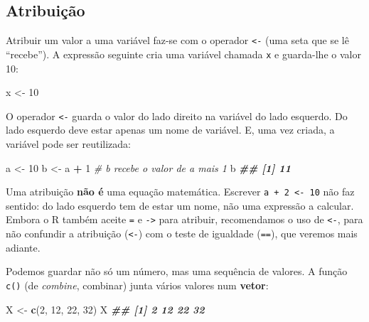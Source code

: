 \documentclass[
  portuguese,
  11pt,
  openany]{book}
\newenvironment{Shaded}{\begin{snugshade}}{\end{snugshade}}
\newcommand{\CommentTok}[1]{\textcolor[rgb]{0.56,0.35,0.01}{\textit{#1}}}
\newcommand{\DecValTok}[1]{\textcolor[rgb]{0.00,0.00,0.81}{#1}}
\newcommand{\DocumentationTok}[1]{\textcolor[rgb]{0.56,0.35,0.01}{\textbf{\textit{#1}}}}
\newcommand{\FunctionTok}[1]{\textcolor[rgb]{0.13,0.29,0.53}{\textbf{#1}}}
\newcommand{\NormalTok}[1]{#1}
\newcommand{\OtherTok}[1]{\textcolor[rgb]{0.56,0.35,0.01}{#1}}
\newcommand{\SpecialCharTok}[1]{\textcolor[rgb]{0.81,0.36,0.00}{\textbf{#1}}}
\begin{document}
\subsection{Atribuição}\label{atribuiuxe7uxe3o}

Atribuir um valor a uma variável faz-se com o operador \texttt{\textless{}-} (uma seta que se lê ``recebe''). A expressão seguinte cria uma variável chamada \texttt{x} e guarda-lhe o valor 10:

\begin{Shaded}
\begin{Highlighting}[]
\NormalTok{x }\OtherTok{\textless{}{-}} \DecValTok{10}
\end{Highlighting}
\end{Shaded}

O operador \texttt{\textless{}-} guarda o valor do lado direito na variável do lado esquerdo. Do lado esquerdo deve estar apenas um nome de variável. E, uma vez criada, a
variável pode ser reutilizada:

\begin{Shaded}
\begin{Highlighting}[]
\NormalTok{a }\OtherTok{\textless{}{-}} \DecValTok{10}
\NormalTok{b }\OtherTok{\textless{}{-}}\NormalTok{ a }\SpecialCharTok{+} \DecValTok{1}   \CommentTok{\# b recebe o valor de a mais 1}
\NormalTok{b}
\DocumentationTok{\#\# [1] 11}
\end{Highlighting}
\end{Shaded}

Uma atribuição \textbf{não é} uma equação matemática. Escrever \texttt{a\ +\ 2\ \textless{}-\ 10} não faz sentido: do lado esquerdo tem de estar um nome, não uma expressão a calcular. Embora o R também aceite \texttt{=} e \texttt{-\textgreater{}} para atribuir, recomendamos o uso de \texttt{\textless{}-}, para não confundir a atribuição (\texttt{\textless{}-}) com o teste de igualdade (\texttt{==}), que veremos mais adiante.

Podemos guardar não só um número, mas uma sequência de valores. A função \texttt{c()} (de \emph{combine}, combinar) junta vários valores num \textbf{vetor}:

\begin{Shaded}
\begin{Highlighting}[]
\NormalTok{X }\OtherTok{\textless{}{-}} \FunctionTok{c}\NormalTok{(}\DecValTok{2}\NormalTok{, }\DecValTok{12}\NormalTok{, }\DecValTok{22}\NormalTok{, }\DecValTok{32}\NormalTok{)}
\NormalTok{X}
\DocumentationTok{\#\# [1]  2 12 22 32}
\end{Highlighting}
\end{Shaded}
\end{document}

